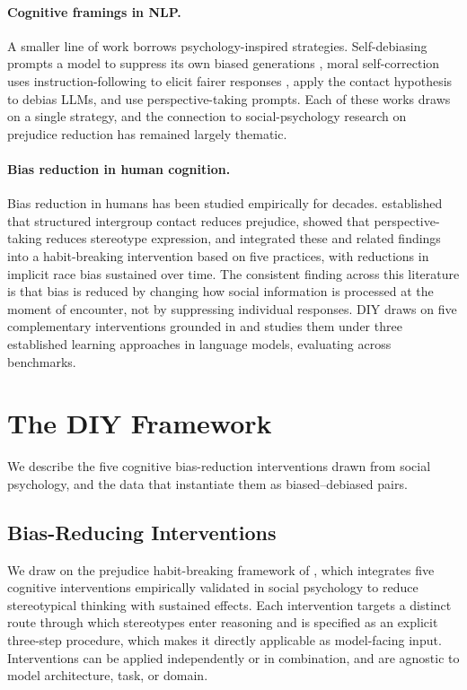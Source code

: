 \documentclass[11pt]{article}
\newcommand{\diylabel}{\textsc{DIY}}
\begin{document}
\paragraph{Cognitive framings in NLP.} A smaller line of work borrows psychology-inspired strategies. Self-debiasing prompts a model to suppress its own biased generations \citep{schick2021self}, moral self-correction uses instruction-following to elicit fairer responses \citep{ganguli2023capacity}, \citet{raj2024breaking} apply the contact hypothesis to debias LLMs, and \citet{xu-etal-2024-walking} use perspective-taking prompts. Each of these works draws on a single strategy, and the connection to social-psychology research on prejudice reduction has remained largely thematic.

\paragraph{Bias reduction in human cognition.} Bias reduction in humans has been studied empirically for decades. \citet{allport1954nature} established that structured intergroup contact reduces prejudice, \citet{galinsky2000perspective} showed that perspective-taking reduces stereotype expression, and \citet{devine2012longterm} integrated these and related findings into a habit-breaking intervention based on five practices, with reductions in implicit race bias sustained over time. The consistent finding across this literature is that bias is reduced by changing how social information is processed at the moment of encounter, not by suppressing individual responses. \diylabel{} draws on five complementary interventions grounded in \citet{devine2012longterm} and studies them under three established learning approaches in language models, evaluating across benchmarks.

\section{The DIY Framework}
\label{sec:data-methods}

We describe the five cognitive bias-reduction interventions drawn from social psychology, and the data that instantiate them as biased--debiased pairs.


\subsection{Bias-Reducing Interventions}
\label{sec:strategies}

We draw on the prejudice habit-breaking framework of \citet{devine2012longterm}, which integrates five cognitive interventions empirically validated in social psychology to reduce stereotypical thinking with sustained effects. Each intervention targets a distinct route through which stereotypes enter reasoning and is specified as an explicit three-step procedure, which makes it directly applicable as model-facing input. Interventions can be applied independently or in combination, and are agnostic to model architecture, task, or domain.
\end{document}
